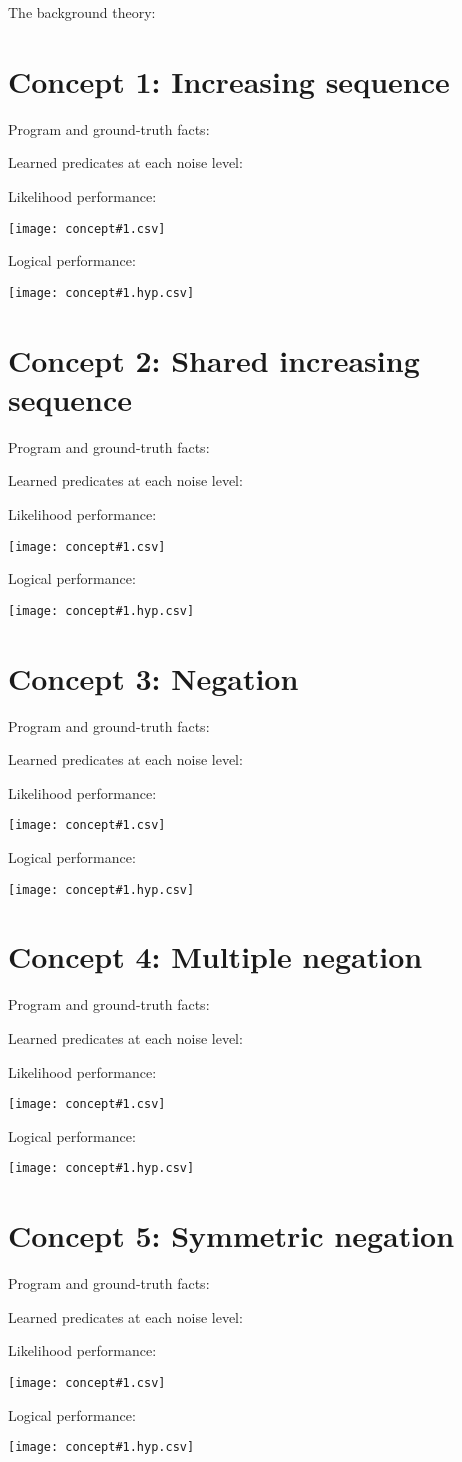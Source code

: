 \documentclass{article}
\begin{document}
The background theory:

\lstset{language=Prolog}



\newcommand\ConceptResults[1]{
Program and ground-truth facts:

\lstset{language=Python}


Learned predicates at each noise level:

\lstset{language=HTML}


Likelihood performance:

\texttt{[image: concept\#1.csv]}

Logical performance:

\texttt{[image: concept\#1.hyp.csv]}
}

\section{Concept 1: Increasing sequence}

\ConceptResults{1}

\section{Concept 2: Shared increasing sequence}

\ConceptResults{2}

\section{Concept 3: Negation}

\ConceptResults{3}

\section{Concept 4: Multiple negation}

\ConceptResults{4}

\section{Concept 5: Symmetric negation}

\ConceptResults{5}
\end{document}

